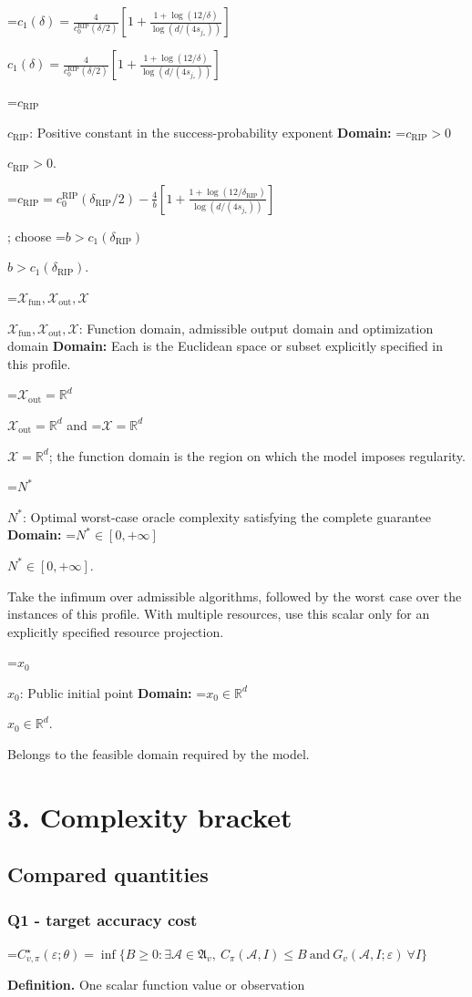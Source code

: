 \documentclass[10pt,a4paper]{article}
\newcommand{\AtlasMath}[1]{\par\begingroup\centering\setbox0=\hbox{$\displaystyle #1$}\ifdim\wd0>1.4\linewidth\typeout{ATLAS WIDE FORMULA: \the\wd0}\fi\ifdim\wd0>\linewidth\resizebox{\linewidth}{!}{\box0}\else\box0\fi\par\endgroup}
\newcommand{\AtlasInlineMath}[1]{\begingroup\setbox0=\hbox{$#1$}\ifdim\wd0>.4\linewidth\endgroup\AtlasMath{#1}\else\endgroup$#1$\fi}
\begin{document}
\AtlasInlineMath{c_1(\delta)=\frac{4}{c_0^{\mathrm{RIP}}(\delta/2)}\left[1+\frac{1+\log(12/\delta)}{\log(d/(4s_{j_*}))}\right]}

\AtlasInlineMath{c_{\mathrm{RIP}}}: Positive constant in the success-probability exponent \textbf{Domain:} \AtlasInlineMath{c_{\mathrm{RIP}}>0}.


\AtlasMath{c_{\mathrm{RIP}}=c_0^{\mathrm{RIP}}(\delta_{\mathrm{RIP}}/2)-\frac4b\left[1+\frac{1+\log(12/\delta_{\mathrm{RIP}})}{\log(d/(4s_{j_*}))}\right]}
; choose \AtlasInlineMath{b>c_1(\delta_{\mathrm{RIP}})}.

\AtlasInlineMath{\mathcal{X}_{\mathrm{fun}},\mathcal{X}_{\mathrm{out}},\mathcal{X}}: Function domain, admissible output domain and optimization domain \textbf{Domain:} Each is the Euclidean space or subset explicitly specified in this profile.

\AtlasInlineMath{\mathcal{X}_{\mathrm{out}}=\mathbb{R}^d} and \AtlasInlineMath{\mathcal{X}=\mathbb{R}^d}; the function domain is the region on which the model imposes regularity.

\AtlasInlineMath{N^*}: Optimal worst-case oracle complexity satisfying the complete guarantee \textbf{Domain:} \AtlasInlineMath{N^*\in[0,+\infty]}.

Take the infimum over admissible algorithms, followed by the worst case over the instances of this profile. With multiple resources, use this scalar only for an explicitly specified resource projection.

\AtlasInlineMath{x_0}: Public initial point \textbf{Domain:} \AtlasInlineMath{x_0\in\mathbb{R}^d}.

Belongs to the feasible domain required by the model.

\section{3. Complexity bracket}
\subsection{Compared quantities}
\subsubsection{Q1 - target accuracy cost}
\AtlasMath{C^\star_{v,\pi}(\varepsilon;\theta)=\inf\{B\ge0:\exists\mathcal A\in\mathfrak A_v,\ C_\pi(\mathcal A,I)\le B\ \text{and}\ G_v(\mathcal A,I;\varepsilon)\ \forall I\}}
\textbf{Definition.} One scalar function value or observation
\end{document}
